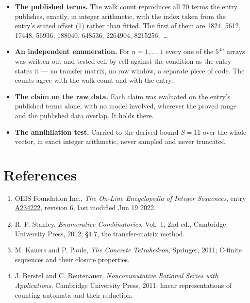 \documentclass[11pt]{article}
\theoremstyle{definition}
\begin{document}
\begin{itemize}

\item {\bfseries The published terms.} The walk count reproduces all 20 terms the entry publishes, exactly, in integer arithmetic, with the index taken from the entry's stated offset (1) rather than fitted. The first of them are 1824, 5612, 17448, 56936, 188040, 648536, 2264904, 8215256,~\dots

\item {\bfseries An independent enumeration.} For $n = 1,\dots,1$ every one of the $5^{4n}$ arrays was written out and tested cell by cell against the condition as the entry states it --- no transfer matrix, no row window, a separate piece of code. The counts agree with the walk count and with the entry.

\item {\bfseries The claim on the raw data.} Each claim was evaluated on the entry's published terms alone, with no model involved, wherever the proved range and the published data overlap. It holds there.

\item {\bfseries The annihilation test.} Carried to the derived bound $S = 11$ over the whole vector, in exact integer arithmetic, never sampled and never truncated.

\end{itemize}

\section{References}

\begin{enumerate}

\item OEIS Foundation Inc., \emph{The On-Line Encyclopedia of Integer Sequences}, entry \href{https://oeis.org/A234222}{A234222}, revision 6, last modified Jun 19 2022.

\item R. P. Stanley, \emph{Enumerative Combinatorics}, Vol.~1, 2nd ed., Cambridge University Press, 2012; \S4.7, the transfer-matrix method.

\item M. Kauers and P. Paule, \emph{The Concrete Tetrahedron}, Springer, 2011; C-finite sequences and their closure properties.

\item J. Berstel and C. Reutenauer, \emph{Noncommutative Rational Series with Applications}, Cambridge University Press, 2011; linear representations of counting automata and their reduction.

\end{enumerate}
\end{document}
